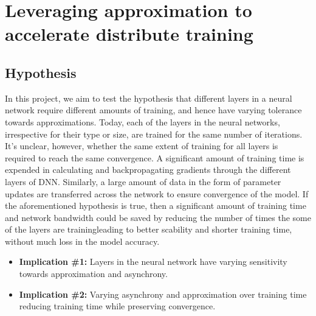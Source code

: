 \section{Leveraging approximation to accelerate distribute training}
\subsection{Hypothesis}
In this project, we aim to test the hypothesis that different layers in a neural network require different amounts of training, and hence have varying tolerance towards approximations. Today, each of the layers in the neural networks, irrespective for their type or size, are trained for the same number of iterations. It's unclear, however, whether the same extent of training for all layers is required to reach the same convergence. A significant amount of training time is expended in calculating and backpropagating gradients through the different layers of DNN. Similarly, a large amount of data in the form of parameter updates are transferred across the network to ensure convergence of the model. If the aforementioned hypothesis is true, then a significant amount of training time and network bandwidth could be saved by reducing the number of times the some of the layers are training{\emdash}leading to better scability and shorter training time, without much loss in the model accuracy.  

\begin{itemize}
\item \textbf{Implication \#1:} Layers in the neural network have varying sensitivity towards approximation and asynchrony.
\item \textbf{Implication \#2:} Varying asynchrony and approximation over training time reducing training time while preserving convergence.
\end{itemize}
